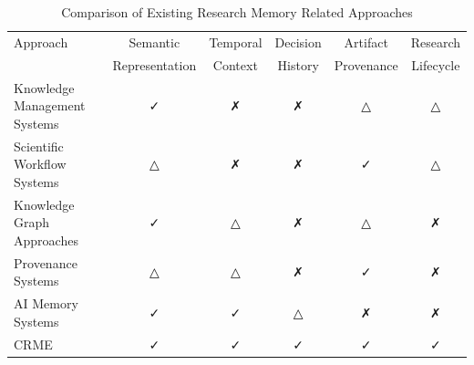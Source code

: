 
\begin{table}[ht]
\centering
\caption{Comparison of Existing Research Memory Related Approaches}
\label{tab:related_work_comparison}

\begin{tabular}{lccccc}
\hline
Approach &
Semantic &
Temporal &
Decision &
Artifact &
Research \\

&
Representation &
Context &
History &
Provenance &
Lifecycle \\

\hline

Knowledge Management Systems & ✓ & ✗ & ✗ & △ & △ \\
Scientific Workflow Systems & △ & ✗ & ✗ & ✓ & △ \\
Knowledge Graph Approaches & ✓ & △ & ✗ & △ & ✗ \\
Provenance Systems & △ & △ & ✗ & ✓ & ✗ \\
AI Memory Systems & ✓ & ✓ & △ & ✗ & ✗ \\
CRME & ✓ & ✓ & ✓ & ✓ & ✓ \\

\hline
\end{tabular}
\end{table}
